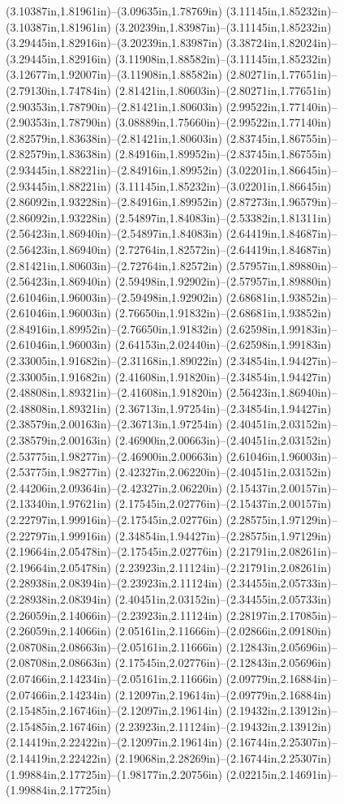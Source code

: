 (3.10387in,1.81961in)--(3.09635in,1.78769in) (3.11145in,1.85232in)--(3.10387in,1.81961in) (3.20239in,1.83987in)--(3.11145in,1.85232in) (3.29445in,1.82916in)--(3.20239in,1.83987in) (3.38724in,1.82024in)--(3.29445in,1.82916in) (3.11908in,1.88582in)--(3.11145in,1.85232in) (3.12677in,1.92007in)--(3.11908in,1.88582in) (2.80271in,1.77651in)--(2.79130in,1.74784in) (2.81421in,1.80603in)--(2.80271in,1.77651in) (2.90353in,1.78790in)--(2.81421in,1.80603in) (2.99522in,1.77140in)--(2.90353in,1.78790in) (3.08889in,1.75660in)--(2.99522in,1.77140in) (2.82579in,1.83638in)--(2.81421in,1.80603in) (2.83745in,1.86755in)--(2.82579in,1.83638in) (2.84916in,1.89952in)--(2.83745in,1.86755in) (2.93445in,1.88221in)--(2.84916in,1.89952in) (3.02201in,1.86645in)--(2.93445in,1.88221in) (3.11145in,1.85232in)--(3.02201in,1.86645in) (2.86092in,1.93228in)--(2.84916in,1.89952in) (2.87273in,1.96579in)--(2.86092in,1.93228in) (2.54897in,1.84083in)--(2.53382in,1.81311in) (2.56423in,1.86940in)--(2.54897in,1.84083in) (2.64419in,1.84687in)--(2.56423in,1.86940in) (2.72764in,1.82572in)--(2.64419in,1.84687in) (2.81421in,1.80603in)--(2.72764in,1.82572in) (2.57957in,1.89880in)--(2.56423in,1.86940in) (2.59498in,1.92902in)--(2.57957in,1.89880in) (2.61046in,1.96003in)--(2.59498in,1.92902in) (2.68681in,1.93852in)--(2.61046in,1.96003in) (2.76650in,1.91832in)--(2.68681in,1.93852in) (2.84916in,1.89952in)--(2.76650in,1.91832in) (2.62598in,1.99183in)--(2.61046in,1.96003in) (2.64153in,2.02440in)--(2.62598in,1.99183in) (2.33005in,1.91682in)--(2.31168in,1.89022in) (2.34854in,1.94427in)--(2.33005in,1.91682in) (2.41608in,1.91820in)--(2.34854in,1.94427in) (2.48808in,1.89321in)--(2.41608in,1.91820in) (2.56423in,1.86940in)--(2.48808in,1.89321in) (2.36713in,1.97254in)--(2.34854in,1.94427in) (2.38579in,2.00163in)--(2.36713in,1.97254in) (2.40451in,2.03152in)--(2.38579in,2.00163in) (2.46900in,2.00663in)--(2.40451in,2.03152in) (2.53775in,1.98277in)--(2.46900in,2.00663in) (2.61046in,1.96003in)--(2.53775in,1.98277in) (2.42327in,2.06220in)--(2.40451in,2.03152in) (2.44206in,2.09364in)--(2.42327in,2.06220in) (2.15437in,2.00157in)--(2.13340in,1.97621in) (2.17545in,2.02776in)--(2.15437in,2.00157in) (2.22797in,1.99916in)--(2.17545in,2.02776in) (2.28575in,1.97129in)--(2.22797in,1.99916in) (2.34854in,1.94427in)--(2.28575in,1.97129in) (2.19664in,2.05478in)--(2.17545in,2.02776in) (2.21791in,2.08261in)--(2.19664in,2.05478in) (2.23923in,2.11124in)--(2.21791in,2.08261in) (2.28938in,2.08394in)--(2.23923in,2.11124in) (2.34455in,2.05733in)--(2.28938in,2.08394in) (2.40451in,2.03152in)--(2.34455in,2.05733in) (2.26059in,2.14066in)--(2.23923in,2.11124in) (2.28197in,2.17085in)--(2.26059in,2.14066in) (2.05161in,2.11666in)--(2.02866in,2.09180in) (2.08708in,2.08663in)--(2.05161in,2.11666in) (2.12843in,2.05696in)--(2.08708in,2.08663in) (2.17545in,2.02776in)--(2.12843in,2.05696in) (2.07466in,2.14234in)--(2.05161in,2.11666in) (2.09779in,2.16884in)--(2.07466in,2.14234in) (2.12097in,2.19614in)--(2.09779in,2.16884in) (2.15485in,2.16746in)--(2.12097in,2.19614in) (2.19432in,2.13912in)--(2.15485in,2.16746in) (2.23923in,2.11124in)--(2.19432in,2.13912in) (2.14419in,2.22422in)--(2.12097in,2.19614in) (2.16744in,2.25307in)--(2.14419in,2.22422in) (2.19068in,2.28269in)--(2.16744in,2.25307in) (1.99884in,2.17725in)--(1.98177in,2.20756in) (2.02215in,2.14691in)--(1.99884in,2.17725in) 